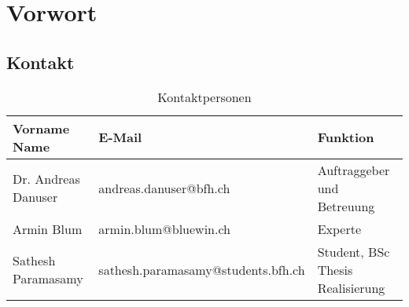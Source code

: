 \chapter*{Vorwort}
\label{chap:vorwort}




\section*{Kontakt}
\label{sec:vorwort_kontakt}

\begin{table}[H]
	\begin{tabular}{lll} \toprule
		\textbf{Vorname Name} & \textbf{E-Mail} & \textbf{Funktion} \\ \midrule
		Dr. Andreas Danuser & andreas.danuser@bfh.ch & Auftraggeber und Betreuung\\ \midrule
		Armin Blum & armin.blum@bluewin.ch & Experte\\ \midrule
		Sathesh Paramasamy & sathesh.paramasamy@students.bfh.ch & Student, BSc Thesis Realisierung \\ \bottomrule
	\end{tabular}
	\caption*{Kontaktpersonen}
	\label{tab:kontaktpersonen}
\end{table}